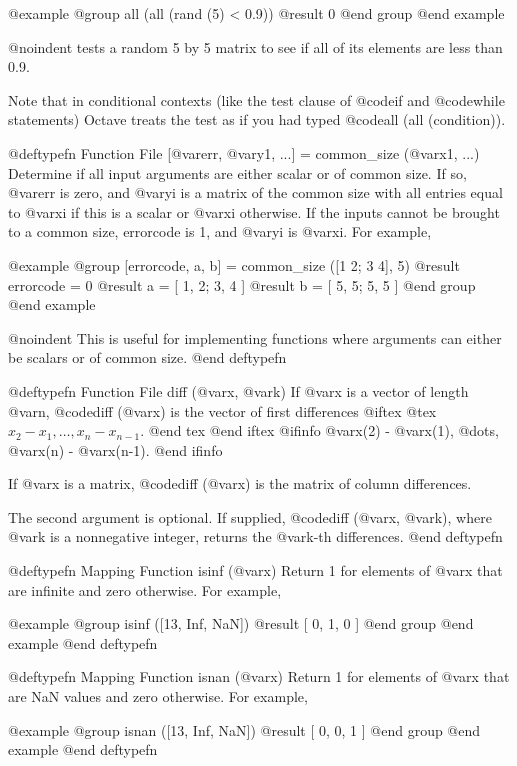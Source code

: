 @example
@group
all (all (rand (5) < 0.9))
     @result{} 0
@end group
@end example

@noindent
tests a random 5 by 5 matrix to see if all of its elements are less
than 0.9.

Note that in conditional contexts (like the test clause of @code{if} and
@code{while} statements) Octave treats the test as if you had typed
@code{all (all (condition))}.

@deftypefn {Function File} {[@var{err}, @var{y1}, ...] =} common_size (@var{x1}, ...)
Determine if all input arguments are either scalar or of common
size.  If so, @var{err} is zero, and @var{yi} is a matrix of the
common size with all entries equal to @var{xi} if this is a scalar or
@var{xi} otherwise.  If the inputs cannot be brought to a common size,
errorcode is 1, and @var{yi} is @var{xi}.  For example,

@example
@group
[errorcode, a, b] = common_size ([1 2; 3 4], 5)
     @result{} errorcode = 0
     @result{} a = [ 1, 2; 3, 4 ]
     @result{} b = [ 5, 5; 5, 5 ]
@end group
@end example

@noindent
This is useful for implementing functions where arguments can either
be scalars or of common size.
@end deftypefn

@deftypefn {Function File} {} diff (@var{x}, @var{k})
If @var{x} is a vector of length @var{n}, @code{diff (@var{x})} is the
vector of first differences
@iftex
@tex
 $x_2 - x_1, \ldots{}, x_n - x_{n-1}$.
@end tex
@end iftex
@ifinfo
 @var{x}(2) - @var{x}(1), @dots{}, @var{x}(n) - @var{x}(n-1).
@end ifinfo

If @var{x} is a matrix, @code{diff (@var{x})} is the matrix of column
differences.

The second argument is optional.  If supplied, @code{diff (@var{x},
@var{k})}, where @var{k} is a nonnegative integer, returns the
@var{k}-th differences.
@end deftypefn

@deftypefn {Mapping Function} {} isinf (@var{x})
Return 1 for elements of @var{x} that are infinite and zero
otherwise. For example,

@example
@group
isinf ([13, Inf, NaN])
     @result{} [ 0, 1, 0 ]
@end group
@end example
@end deftypefn

@deftypefn {Mapping Function} {} isnan (@var{x})
Return 1 for elements of @var{x} that are NaN values and zero
otherwise. For example,

@example
@group
isnan ([13, Inf, NaN])
     @result{} [ 0, 0, 1 ]
@end group
@end example
@end deftypefn

